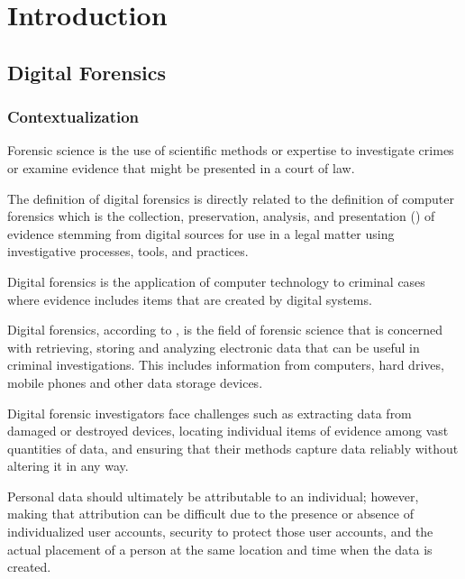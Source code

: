 
\chapter{Introduction}
\label{ch:introduction}

\section{Digital Forensics}

\subsection{Contextualization}

Forensic science is the use of scientific methods or expertise to investigate crimes
or examine evidence that might be presented in a court of law.

The definition of digital forensics is directly related to the definition of
computer forensics which is the collection, preservation, analysis,
and presentation () of evidence stemming from digital sources for use in a legal matter
using investigative processes, tools, and practices.

Digital forensics is the application of computer technology to criminal cases where evidence
includes items that are created by digital systems.

Digital forensics, according to \citeauthor{nist}, is the field of forensic science that is concerned with retrieving,
storing and analyzing electronic data that can be useful in criminal investigations.
This includes information from computers, hard drives, mobile phones and other data
storage devices.

Digital forensic investigators face challenges such as extracting data from damaged or destroyed
devices, locating individual items of evidence among vast quantities of data,
and ensuring that their methods capture data reliably without altering it in any way.

Personal data should ultimately be attributable to an individual; however, making
that attribution can be difficult due to the presence or absence of individualized
user accounts, security to protect those user accounts, and the actual placement of a
person at the same location and time when the data is created.

